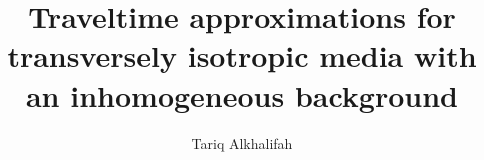 



\def\beq{\begin{equation}}
\def\eeq{\end{equation}}
\def\beqa{\begin{eqnarray}}
\def\eeqa{\end{eqnarray}}

\title{Traveltime approximations for transversely isotropic media with an inhomogeneous background}


\author{Tariq Alkhalifah}

\maketitle

